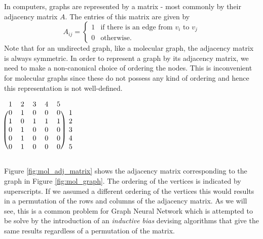 In computers, graphs are represented by a matrix - most commonly by their adjacency matrix $A$. The entries of this matrix are given by 
\begin{equation}
A_{ij} = 
\begin{cases}
1 & \text{if there is an edge from } v_i \text{ to } v_j \\
0 & \text{otherwise.}
\end{cases}
\end{equation}
Note that for an undirected graph, like a molecular graph, the adjacency matrix is always symmetric. In order to represent a graph by its adjacency matrix, we need to make a non-canonical choice of ordering the nodes. This is inconvenient for molecular graphs since these do not possess any kind of ordering and hence this representation is not well-defined. 

\begin{minipage}{0.5\textwidth}
	\centering
	\label{fig:mol_graph}
\end{minipage}
\begin{minipage}{0.5\textwidth}
	\centering
	$
	\begin{blockarray}{cccccc}
	1 & 2 & 3 & 4 & 5 \\
	\begin{block}{(ccccc)c}
	0 & 1 & 0 & 0 & 0 & 1 \\
	1 & 0 & 1 & 1 & 1 & 2 \\
	0 & 1 & 0 & 0 & 0 & 3 \\
	0 & 1 & 0 & 0 & 0 & 4 \\
	0 & 1 & 0 & 0 & 0 & 5 \\
	\end{block}
	\end{blockarray}
	$
	\label{fig:mol_adj_matrix}
\end{minipage}
\newline\newline
Figure \ref{fig:mol_adj_matrix} shows the adjacency matrix corresponding to the graph in Figure \ref{fig:mol_graph}. The ordering of the vertices is indicated by superscripts. If we assumed a different ordering of the vertices this would results in a permutation of the rows and columns of the adjacency matrix. As we will see, this is a common problem for Graph Neural Network which is attempted to be solve by the introduction of an \emph{inductive bias} devising algorithms that give the same results regardless of a permutation of the matrix.

